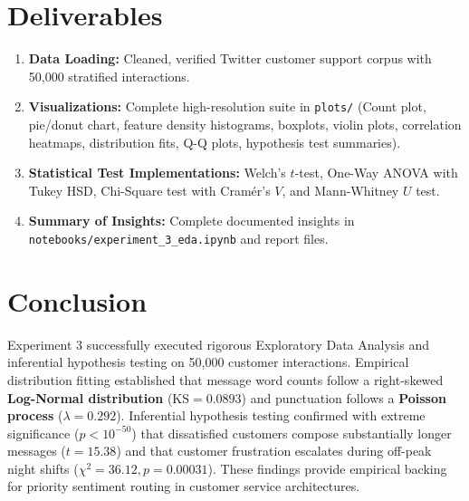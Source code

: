 \documentclass[11pt, a4paper]{article}
\begin{document}
\section*{Deliverables}
\begin{enumerate}[leftmargin=1.5em]
    \item \textbf{Data Loading:} Cleaned, verified Twitter customer support corpus with 50,000 stratified interactions.
    \item \textbf{Visualizations:} Complete high-resolution suite in \texttt{plots/} (Count plot, pie/donut chart, feature density histograms, boxplots, violin plots, correlation heatmaps, distribution fits, Q-Q plots, hypothesis test summaries).
    \item \textbf{Statistical Test Implementations:} Welch's $t$-test, One-Way ANOVA with Tukey HSD, Chi-Square test with Cram\'er's $V$, and Mann-Whitney $U$ test.
    \item \textbf{Summary of Insights:} Complete documented insights in \texttt{notebooks/experiment\_3\_eda.ipynb} and report files.
\end{enumerate}

\section*{Conclusion}
Experiment 3 successfully executed rigorous Exploratory Data Analysis and inferential hypothesis testing on 50,000 customer interactions. Empirical distribution fitting established that message word counts follow a right-skewed \textbf{Log-Normal distribution} ($\text{KS} = 0.0893$) and punctuation follows a \textbf{Poisson process} ($\lambda = 0.292$). Inferential hypothesis testing confirmed with extreme significance ($p < 10^{-50}$) that dissatisfied customers compose substantially longer messages ($t = 15.38$) and that customer frustration escalates during off-peak night shifts ($\chi^2 = 36.12, p = 0.00031$). These findings provide empirical backing for priority sentiment routing in customer service architectures.
\end{document}
